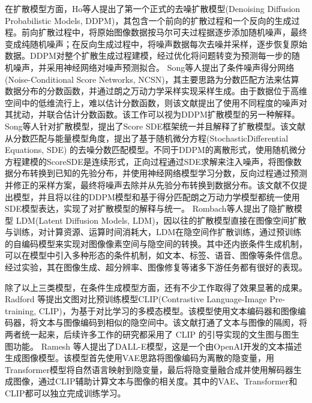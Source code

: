 \par
在扩散模型方面，Ho\cite{hoDenoisingDiffusionProbabilistic2020}等人提出了第一个正式的去噪扩散模型(Denoising Diffusion Probabilistic Models, DDPM)，其包含一个前向的扩散过程和一个反向的生成过程。前向扩散过程中，将原始图像数据按马尔可夫过程据逐步添加随机噪声，最终变成纯随机噪声；在反向生成过程中，将噪声数据每次去噪并采样，逐步恢复原始数据。DDPM对整个扩散生成过程建模，经过优化将问题转变为预测每一步的随机噪声，并采用神经网络对噪声预测拟合。
Song\cite{songGenerativeModelingEstimating2019}等人提出了条件噪声得分网络(Noise-Conditional Score Networks, NCSN)，其主要思路为分数匹配方法来估算数据分布的分数函数，并通过朗之万动力学采样实现采样生成。由于数据位于高维空间中的低维流行上，难以估计分数函数，则该文献提出了使用不同程度的噪声对其扰动，并联合估计分数函数。该工作可以视为DDPM扩散模型的另一种解释。
Song\cite{songScoreBasedGenerativeModeling2021}等人针对扩散模型，提出了Score SDE框架统一并且解释了扩散模型。该文献从分数匹配与能量模型角度，提出了基于随机微分方程(StochasticDifferential Equations, SDE) 的去噪分数匹配模型。不同于DDPM的离散形式，使用随机微分方程建模的ScoreSDE是连续形式，正向过程通过SDE求解来注入噪声，将图像数据分布转换到已知的先验分布，并使用神经网络模型学习分数，反向过程通过预测并修正的采样方案，最终将噪声去除并从先验分布转换到数据分布。该文献不仅提出模型，并且将以往的DDPM模型和基于得分匹配朗之万动力学模型都统一使用SDE模型表达，实现了对扩散模型的解释与统一。
Rombach\cite{rombachHighResolutionImageSynthesis2022}等人提出了隐扩散模型 LDM(Latent Diffusion Models, LDM)，因以往的扩散模型直接在图像空间扩散与训练，对计算资源、运算时间消耗大，LDM在隐空间作扩散训练，通过预训练的自编码模型来实现对图像像素空间与隐空间的转换。其中还内嵌条件生成机制，可以在模型中引入多种形态的条件机制，如文本、标签、语音、图像等条件信息。经过实验，其在图像生成、超分辨率、图像修复等诸多下游任务都有很好的表现。
\par
除了以上三类模型，在条件生成模型方面，还有不少工作取得了效果显著的成果。Radford \cite{pmlr-v139-radford21a}等提出文图对比预训练模型CLIP(Contrastive Language-Image Pre-training, CLIP)，为基于对比学习的多模态模型。该模型使用文本编码器和图像编码器，将文本与图像编码到相似的隐空间中。该文献打通了文本与图像的隔阂，将两者统一起来，后续许多工作的研究都采用了 CLIP 的引导实现的文生图与图生图功能。
Ramesh \cite{pmlr-v139-ramesh21a}等人提出了DALL-E模型，这是一个由OpenAI开发的文本描述生成图像模型。该模型首先使用VAE思路将图像编码为离散的隐变量，用Transformer模型将自然语言映射到隐变量，最后将隐变量融合成并使用解码器生成图像，通过CLIP辅助计算文本与图像的相关度。其中的VAE、Transformer和CLIP都可以独立完成训练学习。
